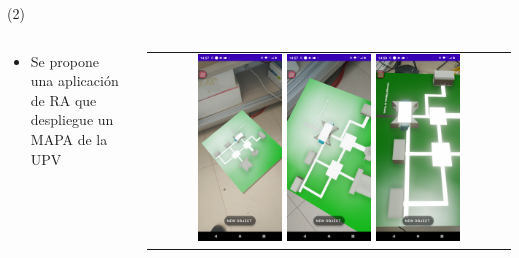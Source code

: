 \begin{frame}{  (2)}
\begin{columns}
\begin{column}{0.4\textwidth}
	\begin{itemize}
		\item Se propone una aplicación de RA que despliegue un MAPA de la UPV
	\end{itemize}
\end{column}
\begin{column}{0.6\textwidth}  
\begin{center}
     \begin{tabular}{c}
\includegraphics[width=0.24\textwidth]{2022_MapaUPV_RealidadAumentada/figs/MapaUPV_01}
\includegraphics[width=0.24\textwidth]{2022_MapaUPV_RealidadAumentada/figs/MapaUPV_02}
\includegraphics[width=0.24\textwidth]{2022_MapaUPV_RealidadAumentada/figs/MapaUPV_03}

\end{tabular}
\end{center}
\end{column}
\end{columns}
\end{frame}
